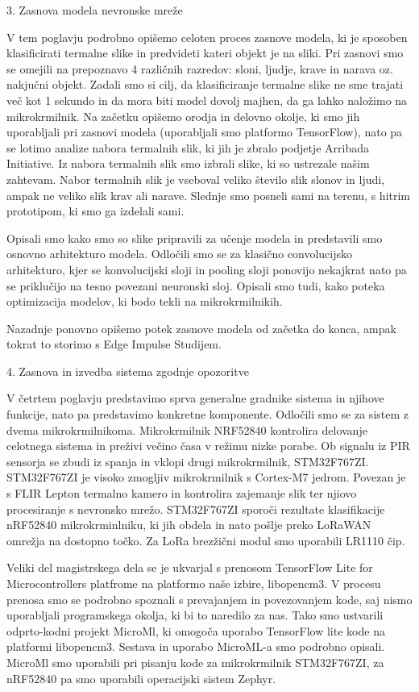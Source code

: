 {3. Zasnova modela nevronske mreže

V tem poglavju podrobno opišemo celoten proces zasnove modela, ki je sposoben klasificirati termalne slike in predvideti kateri objekt je na sliki.
Pri zasnovi smo se omejili na prepoznavo 4 različnih razredov: sloni, ljudje, krave in narava oz. nakjučni objekt. 
Zadali smo si cilj, da klasificiranje termalne slike ne sme trajati več kot 1 sekundo in da mora biti model dovolj majhen, da ga lahko naložimo na mikrokrmilnik.
Na začetku opišemo orodja in delovno okolje, ki smo jih uporabljali pri zasnovi modela (uporabljali smo platformo TensorFlow), nato pa se lotimo analize nabora termalnih slik, ki jih je zbralo podjetje Arribada Initiative.
Iz nabora termalnih slik smo izbrali slike, ki so ustrezale našim zahtevam.
Nabor termalnih slik je vseboval veliko število slik slonov in ljudi, ampak ne veliko slik krav ali narave.
Slednje smo posneli sami na terenu, s hitrim prototipom, ki smo ga izdelali sami.

Opisali smo kako smo so slike pripravili za učenje modela in predstavili smo osnovno arhitekturo modela.
Odločili smo se za klasično convolucijsko arhitekturo, kjer se konvolucijski sloji in pooling sloji ponovijo nekajkrat nato pa se priklučijo na tesno povezani neuronski sloj.
Opisali smo tudi, kako poteka optimizacija modelov, ki bodo tekli na mikrokrmilnikih.

Nazadnje ponovno opišemo potek zasnove modela od začetka do konca, ampak tokrat to storimo s Edge Impulse Studijem.
\newline

4. Zasnova in izvedba sistema zgodnje opozoritve

V četrtem poglavju predstavimo sprva generalne gradnike sistema in njihove funkcije, nato pa predstavimo konkretne komponente.
Odločili smo se za sistem z dvema mikrokrmilnikoma. 
Mikrokrmilnik NRF52840 kontrolira delovanje celotnega sistema in preživi večino časa v režimu nizke porabe.
Ob signalu iz PIR sensorja se zbudi iz spanja in vklopi drugi mikrokrmilnik, STM32F767ZI.
STM32F767ZI je visoko zmogljiv mikrokrmilnik s Cortex-M7 jedrom.
Povezan je s FLIR Lepton termalno kamero in kontrolira zajemanje slik ter njiovo procesiranje s nevronsko mrežo.
STM32F767ZI sporoči rezultate klasifikacije nRF52840 mikrokrminlniku, ki jih obdela in nato pošlje preko LoRaWAN omrežja na dostopno točko.
Za LoRa brezžični modul smo uporabili LR1110 čip.

Veliki del magistrskega dela se je ukvarjal s prenosom TensorFlow Lite for Microcontrollers platfrome na platformo naše izbire, libopencm3.
V procesu prenosa smo se podrobno spoznali s prevajanjem in povezovanjem kode, saj nismo uporabljali programskega okolja, ki bi to naredilo za nas.
Tako smo ustvarili odprto-kodni projekt MicroMl, ki omogoča uporabo TensorFlow lite kode na platformi libopencm3.
Sestava in uporabo MicroML-a smo podrobno opisali.
MicroMl smo uporabili pri pisanju kode za mikrokrmilnik STM32F767ZI, za nRF52840 pa smo uporabili operacijski sistem Zephyr.


}

